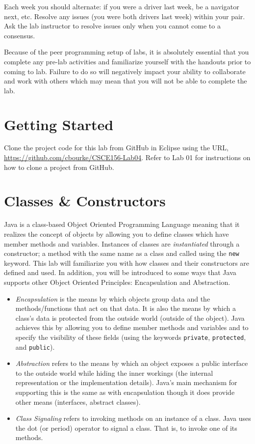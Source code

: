 \documentclass[12pt]{scrartcl}
\begin{document}
Each week you should alternate: if you were a driver last week, 
be a navigator next, etc.  Resolve any issues (you were both drivers
last week) within your pair.  Ask the lab instructor to resolve issues
only when you cannot come to a consensus.  

Because of the peer programming setup of labs, it is absolutely 
essential that you complete any pre-lab activities and familiarize
yourself with the handouts prior to coming to lab.  Failure to do
so will negatively impact your ability to collaborate and work with 
others which may mean that you will not be able to complete the
lab.  

\section*{Getting Started}

Clone the project code for this lab from GitHub in Eclipse using the
URL, \url{https://github.com/cbourke/CSCE156-Lab04}.
Refer to Lab 01 for instructions on how to clone a project from GitHub.

\section*{Classes \& Constructors}

Java is a class-based Object Oriented Programming Language meaning 
that it realizes the concept of objects by allowing you to define 
classes which have member methods and variables.  Instances of classes 
are \emph{instantiated} through a constructor; a method with the same 
name as a class and called using the \texttt{new} keyword.  
This lab will familiarize you with how classes and their constructors 
are defined and used.  In addition, you will be introduced to some ways 
that Java supports other Object Oriented Principles: Encapsulation and 
Abstraction.

\begin{itemize}
  \item \emph{Encapsulation} is the means by which objects group data 
  	and the methods/functions that act on that data.  It is also the 
	means by which a class's data is protected from the outside 
	world (outside of the object).  Java achieves this by allowing 
	you to define member methods and variables and to specify the 
	visibility of these fields (using the keywords \texttt{private}, 
	\texttt{protected}, and \texttt{public}).
  \item \emph{Abstraction} refers to the means by which an object 
	exposes a public interface to the outside world while hiding 
	the inner workings (the internal representation or the implementation 
	details).  Java's main mechanism for supporting this is the same 
	as with encapsulation though it does provide other means 
	(interfaces, abstract classes). 
  \item \emph{Class Signaling} refers to invoking methods on an instance 
	of a class.  Java uses the dot (or period) operator to signal a class. 
	That is, to invoke one of its methods.
\end{itemize}
\end{document}
